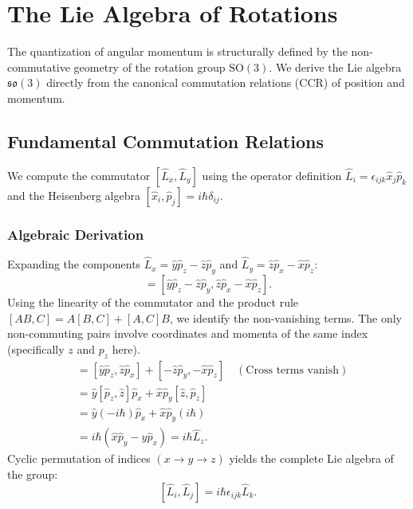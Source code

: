 \section{The Lie Algebra of Rotations}

The quantization of angular momentum is structurally defined by the
non-commutative geometry of the rotation group $\mathrm{SO}(3)$. We derive the Lie
algebra $\mathfrak{so}(3)$ directly from the canonical commutation relations
(CCR) of position and momentum.

\subsection{Fundamental Commutation Relations}

We compute the commutator $[\hat{L}_x, \hat{L}_y]$ using the operator definition
$\hat{L}_i = \epsilon_{ijk} \hat{x}_j \hat{p}_k$ and the Heisenberg algebra
$[\hat{x}_i, \hat{p}_j] = i\hbar \delta_{ij}$.

\subsubsection{Algebraic Derivation}
Expanding the components $\hat{L}_x = \hat{y}\hat{p}_z - \hat{z}\hat{p}_y$ and
$\hat{L}_y = \hat{z}\hat{p}_x - \hat{x}\hat{p}_z$:
\begin{equation}
  [\hat{L}_x, \hat{L}_y] = [\hat{y}\hat{p}_z - \hat{z}\hat{p}_y,
  \hat{z}\hat{p}_x - \hat{x}\hat{p}_z].
\end{equation}
Using the linearity of the commutator and the product rule $[AB, C] = A[B,C] +
[A,C]B$, we identify the non-vanishing terms. The only non-commuting pairs
involve coordinates and momenta of the same index (specifically $z$ and $p_z$
here).
\begin{align}
  [\hat{L}_x, \hat{L}_y] &= [\hat{y}\hat{p}_z, \hat{z}\hat{p}_x] +
  [-\hat{z}\hat{p}_y, -\hat{x}\hat{p}_z] \quad (\text{Cross terms vanish})
  \nonumber \\
                         &= \hat{y}[\hat{p}_z, \hat{z}]\hat{p}_x + \hat{x}\hat{p}_y[\hat{z},
                         \hat{p}_z] \nonumber \\
                         &= \hat{y}(-i\hbar)\hat{p}_x + \hat{x}\hat{p}_y(i\hbar) \nonumber \\
                         &= i\hbar (\hat{x}\hat{p}_y - \hat{y}\hat{p}_x) = i\hbar \hat{L}_z.
\end{align}
Cyclic permutation of indices $(x \to y \to z)$ yields the complete Lie algebra
of the group:
\begin{equation} \label{eq:lie_algebra}
  [\hat{L}_i, \hat{L}_j] = i\hbar \epsilon_{ijk} \hat{L}_k.
\end{equation}

